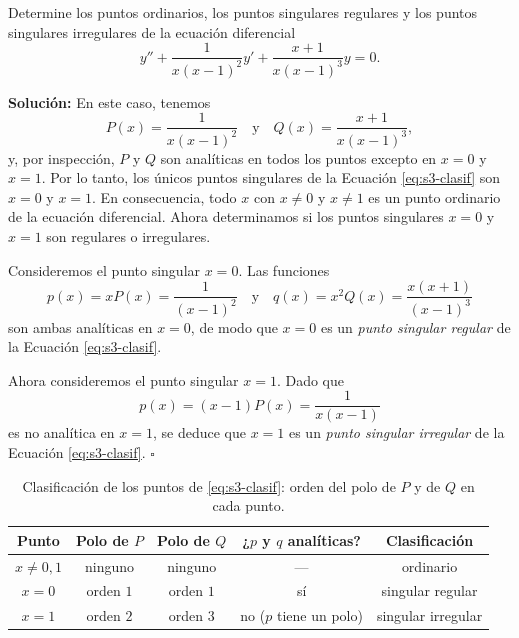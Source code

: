 \begin{example}
    Determine los puntos ordinarios, los puntos singulares regulares y los puntos singulares irregulares de la ecuación diferencial
\begin{equation}
y'' + \frac{1}{x(x - 1)^2}y' + \frac{x + 1}{x(x - 1)^3}y = 0.
\label{eq:s3-clasif}
\end{equation}
 
\noindent \textbf{Solución:} \quad En este caso, tenemos
\[ P(x) = \frac{1}{x(x - 1)^2} \quad \text{y} \quad Q(x) = \frac{x + 1}{x(x - 1)^3}, \]
y, por inspección, $P$ y $Q$ son analíticas en todos los puntos excepto en $x = 0$ y $x = 1$. Por lo tanto, los únicos puntos singulares de la Ecuación \eqref{eq:s3-clasif} son $x = 0$ y $x = 1$. En consecuencia, todo $x$ con $x \neq 0$ y $x \neq 1$ es un punto ordinario de la ecuación diferencial. Ahora determinamos si los puntos singulares $x = 0$ y $x = 1$ son regulares o irregulares.
 
Consideremos el punto singular $x = 0$. Las funciones
\[ p(x) = xP(x) = \frac{1}{(x - 1)^2} \quad \text{y} \quad q(x) = x^2Q(x) = \frac{x(x + 1)}{(x - 1)^3} \]
son ambas analíticas en $x = 0$, de modo que $x = 0$ es un \textit{punto singular regular} de la Ecuación \eqref{eq:s3-clasif}.
 
Ahora consideremos el punto singular $x = 1$. Dado que
\[ p(x) = (x - 1)P(x) = \frac{1}{x(x - 1)} \]
es no analítica en $x = 1$, se deduce que $x = 1$ es un \textit{punto singular irregular} de la Ecuación \eqref{eq:s3-clasif}. \hfill $\square$
\end{example}
 
\begin{table}[H]
\centering
\small
\caption{Clasificación de los puntos de \eqref{eq:s3-clasif}: orden del polo de $P$ y de $Q$ en cada punto.}
\label{tab:s3-clasif}
\begin{tabular}{|c|c|c|c|c|}
\hline
\rowcolor{bbe!15}\textbf{Punto} & \textbf{Polo de $P$} & \textbf{Polo de $Q$} & \textbf{¿$p$ y $q$ analíticas?} & \textbf{Clasificación} \\ \hline
$x\ne 0,1$ & ninguno & ninguno & --- & ordinario \\ \hline
$x=0$ & orden $1$ & orden $1$ & sí & singular regular \\ \hline
$x=1$ & orden $2$ & orden $3$ & no ($p$ tiene un polo) & singular irregular \\ \hline
\end{tabular}
\end{table}
 
